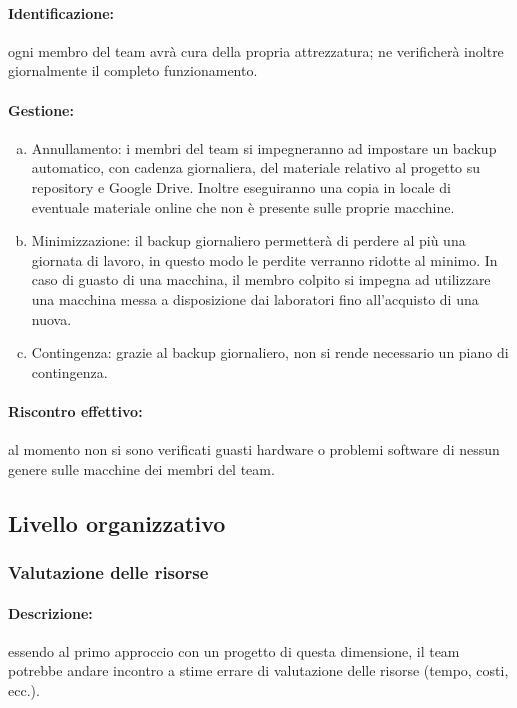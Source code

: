 \documentclass[../PianoProgetto.tex]{subfiles}
\begin{document}
	\paragraph*{Identificazione:} ogni membro del team avrà cura della propria attrezzatura; ne verificherà inoltre giornalmente il completo funzionamento.
	
	\paragraph*{Gestione:}
	\begin{enumerate}[(a)]
		\item Annullamento: i membri del team si impegneranno ad impostare un backup automatico, con cadenza giornaliera, del materiale relativo al progetto su repository e Google Drive. Inoltre eseguiranno una copia in locale di eventuale materiale online che non è presente sulle proprie macchine.
		\item Minimizzazione: il backup giornaliero permetterà di perdere al più una giornata di lavoro, in questo modo le perdite verranno ridotte al minimo. In caso di guasto di una macchina, il membro colpito si impegna ad utilizzare una macchina messa a disposizione dai laboratori fino all'acquisto di una nuova. 
		\item Contingenza: grazie al backup giornaliero, non si rende necessario un piano di contingenza.
	\end{enumerate} 	
	
	\paragraph*{Riscontro effettivo:} al momento non si sono verificati guasti hardware o problemi software di nessun genere sulle macchine dei membri del team.

\subsection{Livello organizzativo}

\subsubsection{Valutazione delle risorse}

	\paragraph*{Descrizione:} essendo al primo approccio con un progetto di questa dimensione, il team potrebbe andare incontro a stime errare di valutazione delle risorse (tempo, costi, ecc.).
	
\end{document}
